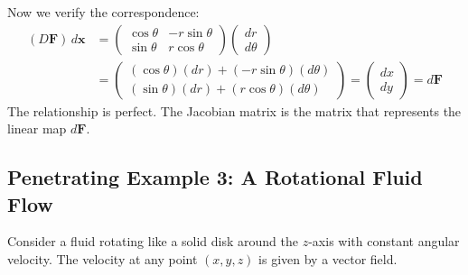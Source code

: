 \documentclass[12pt, letterpaper]{article}
\theoremstyle{definition}
\begin{document}
\begin{itemize}
		Now we verify the correspondence:
		\begin{align*}
			(D\mathbf{F}) \, d\mathbf{x} &= \begin{pmatrix} \cos\theta & -r\sin\theta \\ \sin\theta & r\cos\theta \end{pmatrix} \begin{pmatrix} dr \\ d\theta \end{pmatrix} \\
			&= \begin{pmatrix} (\cos\theta)(dr) + (-r\sin\theta)(d\theta) \\ (\sin\theta)(dr) + (r\cos\theta)(d\theta) \end{pmatrix} = \begin{pmatrix} dx \\ dy \end{pmatrix} = d\mathbf{F}
		\end{align*}
		The relationship is perfect. The Jacobian matrix is the matrix that represents the linear map $d\mathbf{F}$.
	\end{itemize}
	
	\subsection{Penetrating Example 3: A Rotational Fluid Flow}
	Consider a fluid rotating like a solid disk around the $z$-axis with constant angular velocity. The velocity at any point $(x,y,z)$ is given by a vector field.
	
\end{document}
